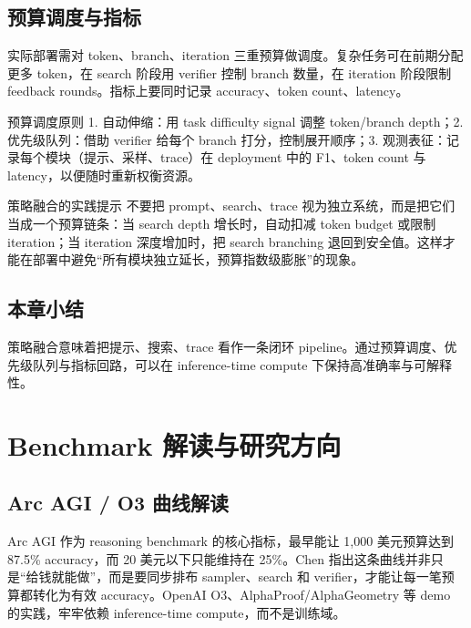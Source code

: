 \documentclass[a4paper]{article}
\begin{document}
\subsection{预算调度与指标}
实际部署需对 token、branch、iteration 三重预算做调度。复杂任务可在前期分配更多 token，在 search 阶段用 verifier 控制 branch 数量，在 iteration 阶段限制 feedback rounds。指标上要同时记录 accuracy、token count、latency。

\begin{knowledgebox}{预算调度原则}
1. 自动伸缩：用 task difficulty signal 调整 token/branch depth；2. 优先级队列：借助 verifier 给每个 branch 打分，控制展开顺序；3. 观测表征：记录每个模块（提示、采样、trace）在 deployment 中的 F1、token count 与 latency，以便随时重新权衡资源。
\end{knowledgebox}

\begin{importantbox}{策略融合的实践提示}
不要把 prompt、search、trace 视为独立系统，而是把它们当成一个预算链条：当 search depth 增长时，自动扣减 token budget 或限制 iteration；当 iteration 深度增加时，把 search branching 退回到安全值。这样才能在部署中避免“所有模块独立延长，预算指数级膨胀”的现象。
\end{importantbox}

\subsection{本章小结}
策略融合意味着把提示、搜索、trace 看作一条闭环 pipeline。通过预算调度、优先级队列与指标回路，可以在 inference-time compute 下保持高准确率与可解释性。

\section{Benchmark 解读与研究方向}

\subsection{Arc AGI / O3 曲线解读}
Arc AGI 作为 reasoning benchmark 的核心指标，最早能让 1,000 美元预算达到 87.5\% accuracy，而 20 美元以下只能维持在 25\%。Chen 指出这条曲线并非只是“给钱就能做”，而是要同步排布 sampler、search 和 verifier，才能让每一笔预算都转化为有效 accuracy。OpenAI O3、AlphaProof/AlphaGeometry 等 demo 的实践，牢牢依赖 inference-time compute，而不是训练域。
\end{document}
